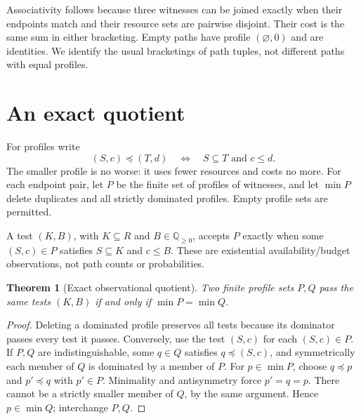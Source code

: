 \documentclass[11pt]{article}
\newtheorem{theorem}{Theorem}
\begin{document}
Associativity follows because three witnesses can be joined exactly when their endpoints match and their resource sets are pairwise disjoint. Their cost is the same sum in either bracketing. Empty paths have profile $(\varnothing,0)$ and are identities. We identify the usual bracketings of path tuples, not different paths with equal profiles.
\section{An exact quotient}
For profiles write
\[
 (S,c)\preceq(T,d)\quad\Longleftrightarrow\quad S\subseteq T\text{ and }c\leq d.
\]
The smaller profile is no worse: it uses fewer resources and costs no more. For each endpoint pair, let $P$ be the finite set of profiles of witnesses, and let $\min P$ delete duplicates and all strictly dominated profiles. Empty profile sets are permitted.

A test $(K,B)$, with $K\subseteq R$ and $B\in\mathbb Q_{\geq0}$, accepts $P$ exactly when some $(S,c)\in P$ satisfies $S\subseteq K$ and $c\leq B$. These are existential availability/budget observations, not path counts or probabilities.
\begin{theorem}[Exact observational quotient]
Two finite profile sets $P,Q$ pass the same tests $(K,B)$ if and only if $\min P=\min Q$.
\end{theorem}
\begin{proof}
Deleting a dominated profile preserves all tests because its dominator passes every test it passes. Conversely, use the test $(S,c)$ for each $(S,c)\in P$. If $P,Q$ are indistinguishable, some $q\in Q$ satisfies $q\preceq(S,c)$, and symmetrically each member of $Q$ is dominated by a member of $P$. For $p\in\min P$, choose $q\preceq p$ and $p'\preceq q$ with $p'\in P$. Minimality and antisymmetry force $p'=q=p$. There cannot be a strictly smaller member of $Q$, by the same argument. Hence $p\in\min Q$; interchange $P,Q$.
\end{proof}
\end{document}
